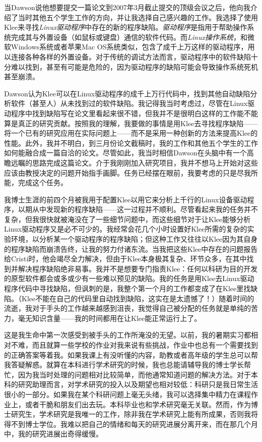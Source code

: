 \documentclass[letter,12pt]{book}
\begin{document}
\begin{CJK}{UTF8}{gbsn}
\breakline

当Dawson说他想要提交一篇论文到2007年3月截止提交的顶级会议之后，他向我介绍了当时其他五个学生工作的方向，并让我选择自己感兴趣的工作。我选择了使用Klee来寻找\emph{Linux驱动程序}中存在的新的程序缺陷。\emph{驱动程序}是指用于帮助操作系统完成其与外置设备（如鼠标或键盘）通信的软件代码。而\emph{Linux操作系统}，和微软Windows系统或者苹果Mac OS系统类似，包含了成千上万这样的驱动程序，用以连接各种各样的外置设备。对于传统的调试方法而言，驱动程序中的软件缺陷十分难以找到，甚至有可能是危险的，因为驱动程序的缺陷可能会导致操作系统死机甚至崩溃。

Dawson认为Klee可以在Linux驱动程序的成千上万行代码中，找到其他自动缺陷分析软件（甚至人）从未找到过的软件缺陷。我记得我当时考虑过，尽管在Linux驱动程序中找到缺陷写在论文里看起来很不错，但我并不是很明白这样的工作能不能算是真正的研究贡献。按照我的理解，我要做的事情是用Klee去寻找程序缺陷——将一个已有的研究应用在实际问题上——而不是采用一种创新的方法来提高Klee的性能。此外，我并不明白，到三月份论文截稿时，我的工作和其他五个学生的工作如何能融合成一篇自洽的论文。尽管如此，我当时相信Dawson在头脑中有一个高瞻远瞩的思路完成这篇论文。介于我刚刚加入研究项目，我并不想马上开始对这些应该由教授决定的问题开始指手画脚。任务已经摆在眼前，我要考虑的只是尽我所能，完成这个任务。

\breakline

我博士生涯的前四个月被我用于配置Klee以用它来分析上千行的Linux设备驱动程序，以期从中发现新的程序缺陷——这一过程并不顺利。尽管看起来我的任务并不复杂，但我很快就被淹没在了一些细节问题中，而这些细节对于让Klee能够分析Linux驱动程序又是必不可少的。我经常会花几个小时设置好Klee所需的复杂的实验环境，以分析某一个驱动程序的程序缺陷；但这种工作又往往以Klee因为其自身的程序缺陷而崩溃告终，让我的努力付诸东流。当我把这些Klee中存在的问题报告给Cristi时，他会竭尽全力解决，但由于Klee本身极其复杂、环节众多，在其中找到并解决程序缺陷绝非易事。我并不是想要专门指责Klee：任何以科研为目的开发的原型软件都会或多或少有一些难以预见的缺陷。我的任务是用Klee去Linux驱动程序代码中寻找缺陷，但讽刺的是，我整个第一个月的工作都变成了在Klee里找缺陷。（Klee不能在自己的代码里自动找到缺陷，这实在是太遗憾了！）随着时间的流逝，我对于手头的工作越来越感到沮丧，我觉得自己被分配的任务就是单纯的苦力，毫无知识含量——我的时间都用在让Klee能正常运行上了。

这是我生命中第一次感受到被手头的工作所淹没的无望。以前，我的暑期实习都相对不难，而且就算一些学校的作业对我来说有些挑战，作业中也总有一个需要找到的正确答案等着我。如果我课上有没听懂的内容，助教或者高年级的学生总可以帮我答疑解惑。就算在本科进行学术研究的时候，我也总能请辅导我的博士学长帮忙，因为我当时处理的问题相对比较简单，而他通常知道问题的解决方法。对于本科的研究助理而言，对学术研究的投入以及期望也相对较低：科研只是我日常生活很小的一部分。如果我在某个科研问题上毫无头绪，我可以选择集中精力在课程作业上，或者干脆和朋友们出去玩。本科毕业也和学术研究毫无关联。然而，作为博士研究生，学术研究是我唯一的工作，除非我在学术研究上能有所成果，否则我将得不到博士学位。我难以把自己的情绪和每天的研究进展分离开来，而在那几个月中，我的研究进展出奇得缓慢。


\end{CJK}
\end{document}
